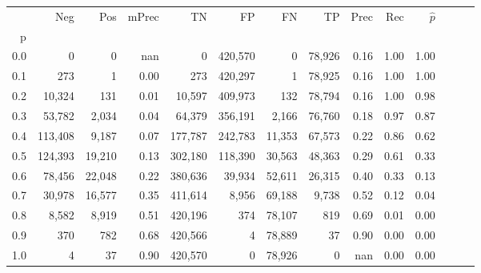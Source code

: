 \begin{tabular}{rrrrrrrrrrrrrr}
\toprule
{} &      Neg &     Pos & mPrec &       TN &       FP &      FN &      TP &  Prec &   Rec & $\hat{p}$ \\
p   &          &         &       &          &          &         &         &       &       &           \\
\midrule
0.0 &        0 &       0 &   nan &        0 &  420,570 &       0 &  78,926 &  0.16 &  1.00 &      1.00 \\
0.1 &      273 &       1 &  0.00 &      273 &  420,297 &       1 &  78,925 &  0.16 &  1.00 &      1.00 \\
0.2 &   10,324 &     131 &  0.01 &   10,597 &  409,973 &     132 &  78,794 &  0.16 &  1.00 &      0.98 \\
0.3 &   53,782 &   2,034 &  0.04 &   64,379 &  356,191 &   2,166 &  76,760 &  0.18 &  0.97 &      0.87 \\
0.4 &  113,408 &   9,187 &  0.07 &  177,787 &  242,783 &  11,353 &  67,573 &  0.22 &  0.86 &      0.62 \\
0.5 &  124,393 &  19,210 &  0.13 &  302,180 &  118,390 &  30,563 &  48,363 &  0.29 &  0.61 &      0.33 \\
0.6 &   78,456 &  22,048 &  0.22 &  380,636 &   39,934 &  52,611 &  26,315 &  0.40 &  0.33 &      0.13 \\
0.7 &   30,978 &  16,577 &  0.35 &  411,614 &    8,956 &  69,188 &   9,738 &  0.52 &  0.12 &      0.04 \\
0.8 &    8,582 &   8,919 &  0.51 &  420,196 &      374 &  78,107 &     819 &  0.69 &  0.01 &      0.00 \\
0.9 &      370 &     782 &  0.68 &  420,566 &        4 &  78,889 &      37 &  0.90 &  0.00 &      0.00 \\
1.0 &        4 &      37 &  0.90 &  420,570 &        0 &  78,926 &       0 &   nan &  0.00 &      0.00 \\
\bottomrule
\end{tabular}
